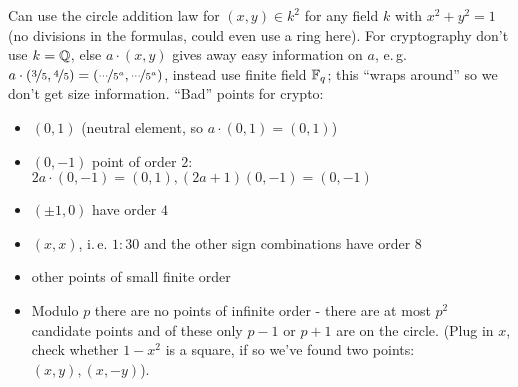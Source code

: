 Can use the circle addition law for $\left(x,y\right) \in k^2$ for any field $k$ with $x^2+y^2 = 1$ (no divisions in the formulas, could even use a ring here). For cryptography don't use $k = \mathbb{Q}$, else $a \cdot \left(x,y\right)$ gives away easy information on  $a$, e.\,g. $a \cdot \left(\nicefrac{3}{5},\nicefrac{4}{5} \right) = \left(\nicefrac{\dots}{5^a},\nicefrac{\dots}{5^a} \right)$, instead use finite field $\mathbb{F}_q$; this ``wraps around'' so we don't get size information. ``Bad'' points for crypto:

\begin{itemize}
\item $\left(0,1\right)$ (neutral element, so $a \cdot \left(0,1\right) = \left(0,1\right)$)
\item $\left(0,-1\right)$ point of order $2$: $2a \cdot \left(0,-1\right) = \left(0,1\right), (2a+1) \left(0,-1\right) = \left(0,-1\right)$
\item $\left(\pm 1,0\right)$ have order $4$
\item $\left(x,x\right)$, i.\,e. $1:30$ and the other sign combinations have order $8$
\item other points of small finite order
\item Modulo $p$ there are no points of infinite order - there are at most $p^2$ candidate points and of these only $p-1$ or $p+1$ are on the circle. (Plug in $x$, check whether $1-x^2$ is a square, if so we've found two points: $(x,y), (x,-y)$).
\end{itemize}

